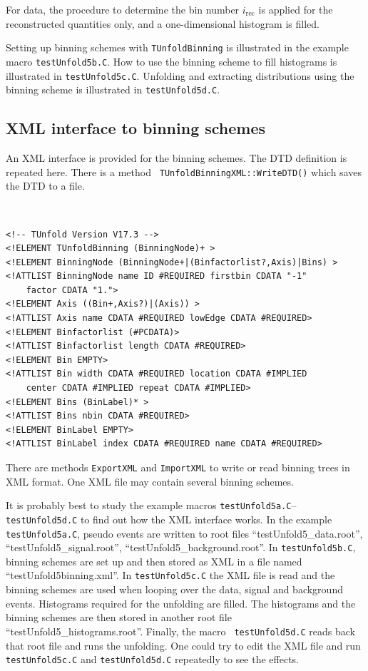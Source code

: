 \documentclass[12pt]{article}
\begin{document}
For data, the procedure to determine the bin number $i_{\text{rec}}$
is applied for the reconstructed quantities only, and a
one-dimensional histogram is filled.

Setting up binning schemes with {\tt TUnfoldBinning} is illustrated in
the example macro {\tt testUnfold5b.C}. How to use the binning scheme to fill
histograms is illustrated in {\tt testUnfold5c.C}.
Unfolding and extracting distributions using the binning scheme is
illustrated in {\tt testUnfold5d.C}.

\subsection{XML interface to binning schemes}

An XML interface is provided for the binning schemes. The DTD
definition is repeated here. There is a method {\tt
  TUnfoldBinningXML::WriteDTD()} which saves the DTD to a file.
{\tt
\begin{verbatim}
<!-- TUnfold Version V17.3 -->
<!ELEMENT TUnfoldBinning (BinningNode)+ >
<!ELEMENT BinningNode (BinningNode+|(Binfactorlist?,Axis)|Bins) >
<!ATTLIST BinningNode name ID #REQUIRED firstbin CDATA "-1"
    factor CDATA "1.">
<!ELEMENT Axis ((Bin+,Axis?)|(Axis)) >
<!ATTLIST Axis name CDATA #REQUIRED lowEdge CDATA #REQUIRED>
<!ELEMENT Binfactorlist (#PCDATA)>
<!ATTLIST Binfactorlist length CDATA #REQUIRED>
<!ELEMENT Bin EMPTY>
<!ATTLIST Bin width CDATA #REQUIRED location CDATA #IMPLIED
    center CDATA #IMPLIED repeat CDATA #IMPLIED>
<!ELEMENT Bins (BinLabel)* >
<!ATTLIST Bins nbin CDATA #REQUIRED>
<!ELEMENT BinLabel EMPTY>
<!ATTLIST BinLabel index CDATA #REQUIRED name CDATA #REQUIRED>
\end{verbatim}
}
There are methods {\tt ExportXML} and {\tt ImportXML} to
write or read binning trees in XML format. One XML file may contain
several binning schemes. 

It is probably best to study the example macros {\tt testUnfold5a.C}--{\tt testUnfold5d.C} to find out how the XML interface works. In 
the example {\tt testUnfold5a.C}, pseudo events are written to root
files ``testUnfold5\_data.root'', ``testUnfold5\_signal.root'', ``testUnfold5\_background.root''. In {\tt testUnfold5b.C}, binning schemes are set up and then
stored as XML in a file named ``testUnfold5binning.xml''.
In {\tt testUnfold5c.C} the XML file is read and the binning schemes
are used when looping over the data, signal and background
events. Histograms required for the unfolding are filled. 
The histograms and the binning schemes are then stored in another root
file ``testUnfold5\_histograms.root''. Finally, the macro {\tt
  testUnfold5d.C} reads back that root file and runs the
unfolding. One could try to edit the XML file and run {\tt
  testUnfold5c.C} and {\tt testUnfold5d.C} repeatedly to see the
effects.
\end{document}
